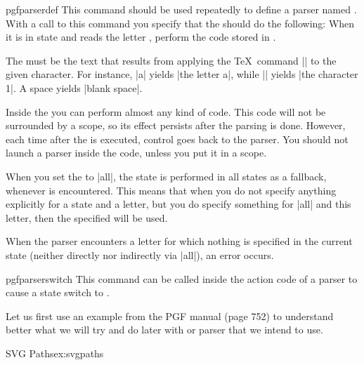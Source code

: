 \begin{docCmd}{pgfparserdef}{ }
  This command should be used repeatedly to define a parser named
  . With a call to this command you specify that the
   should do the following: When it is in state
   and reads the letter , perform the
  code stored in .

  The  must be the text that results from
  applying the \TeX\ command |\meaning| to the given character. For
  instance, |\meaning a| yields |the letter a|, while ||
  yields |the character 1|. A space yields |blank space|. 

  Inside the  you can perform almost any kind of
  code. This code will not be surrounded by a scope, so its effect
  persists after the parsing is done. However, each time after the
   is executed, control goes back to the parser. You
  should not launch a parser inside the  code, unless you
  put it in a scope.

  When you set the  to |all|, the state  is
  performed in all states as a fallback, whenever  is encountered. This means that when you do not specify
  anything explicitly for a state and a letter, but you do specify
  something for |all| and this letter, then the specified
   will be used.

  When the parser encounters a letter for which nothing is specified
  in the current state (neither directly nor indirectly via |all|), an
  error occurs.
\end{docCmd}

\begin{docCmd}{pgfparserswitch}{ }
  This command can be called inside the action code of a parser to
  cause a state switch to .
\end{docCmd}

Let us first use an example from the PGF manual (page 752) to understand better what we will try and do later with
or parser that we intend to use.

\begin{texexample}{SVG Paths}{ex:svgpaths}
\begin{pgfpicture}
\end{pgfpicture}
\end{texexample}

